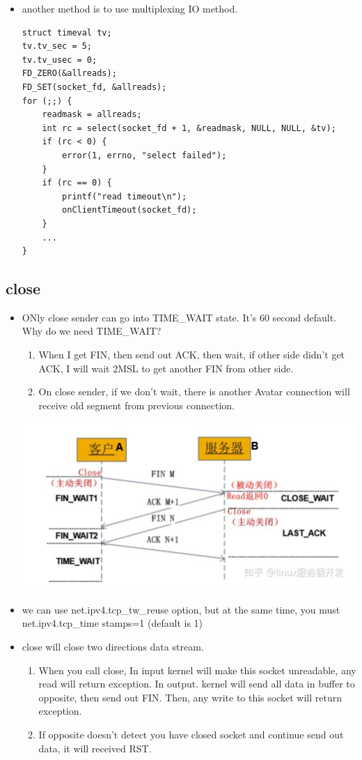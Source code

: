 \documentclass[a4paper,11pt,twoside]{book}
\begin{document}
\begin{itemize}
\item another method is to use multiplexing IO method.
\begin{lstlisting}
struct timeval tv;
tv.tv_sec = 5;
tv.tv_usec = 0;
FD_ZERO(&allreads);
FD_SET(socket_fd, &allreads);
for (;;) {
	readmask = allreads;
	int rc = select(socket_fd + 1, &readmask, NULL, NULL, &tv);
	if (rc < 0) {
		error(1, errno, "select failed");
	}
	if (rc == 0) {
		printf("read timeout\n");
		onClientTimeout(socket_fd);
	}
	...
}
\end{lstlisting}

\end{itemize}

\subsection{close}
\begin{itemize}
	\item ONly close sender can go into TIME\_WAIT state. It's 60 second default. Why do we need TIME\_WAIT? 
	\begin{enumerate}
		\item When I get FIN, then send out ACK, then wait, if other side didn't get ACK, I will wait 2MSL to get another FIN from other side.
		\item On close sender, if we don't wait, there is another Avatar connection will receive old segment from previous connection.
	\end{enumerate}

	\begin{center}
		\includegraphics[width=0.85\linewidth]{pics/tcp2.png}
	\end{center}

	\item we can use net.ipv4.tcp\_tw\_reuse option, but at the same time, you must net.ipv4.tcp\_time
	stamps=1 (default is 1)
	
	\item close will close two directions data stream.
	\begin{enumerate}
		\item When you call close, In input kernel will make this socket unreadable,  any read will return exception. In output.  kernel will send all data in buffer to opposite, then send out FIN. Then, any write to this socket will return exception.
		\item If opposite doesn't detect you have closed socket and continue send out data, it will received RST. 
	\end{enumerate}


\end{itemize}
\end{document}

